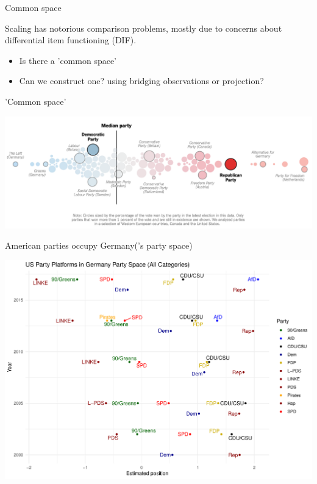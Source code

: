 \documentclass{hertieteaching}
\begin{document}
\begin{frame}{Common space}

Scaling has notorious comparison problems, mostly due to concerns about 
differential item functioning (DIF).
\begin{itemize}
  \item Is there a 'common space' \parencite{Kluver2009}
  \item Can we construct one? using bridging observations or projection?
\end{itemize}

\end{frame}
\begin{frame}{'Common space'}

\centerline{\includegraphics[scale=0.45]{pictures/nyt-parties}}


\end{frame}
\begin{frame}{American parties occupy Germany('s party space)}

\centerline{\includegraphics[scale=1]{pictures/cmpcats_us_in_de}}


\end{frame}
\end{document}
